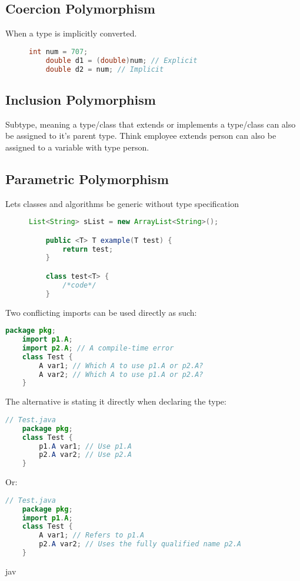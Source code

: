 \subsection*{Coercion Polymorphism}
When a type is implicitly converted.
\begin{figure}[h!]
    \begin{lstlisting}[language=Java]
    int num = 707;
    double d1 = (double)num; // Explicit
    double d2 = num; // Implicit
    \end{lstlisting}
\end{figure}

\subsection*{Inclusion Polymorphism}\label{sec:inclusion_polymorphism}
Subtype, meaning a type/class that extends or implements a type/class can also be assigned to it's parent type. Think employee extends person can also be assigned to a variable with type person.
\clearpage
\subsection*{Parametric Polymorphism}\label{sec:parametric_polymorphism}
Lets classes and algorithms be generic without type specification
\begin{figure}[h!]
    \begin{lstlisting}[language=Java]
    List<String> sList = new ArrayList<String>();

    public <T> T example(T test) {
        return test;
    }

    class test<T> {
        /*code*/
    }
    \end{lstlisting}
\end{figure}
Two conflicting imports can be used directly as such:
\begin{lstlisting}[language=Java]
    package pkg;
    import p1.A;
    import p2.A; // A compile-time error
    class Test {
        A var1; // Which A to use p1.A or p2.A?
        A var2; // Which A to use p1.A or p2.A?
    }
\end{lstlisting}
The alternative is stating it directly when declaring the type:
\begin{lstlisting}[language=Java]
    // Test.java
    package pkg;
    class Test {
        p1.A var1; // Use p1.A
        p2.A var2; // Use p2.A
    }
\end{lstlisting}
Or:
\begin{lstlisting}[language=Java]
    // Test.java
    package pkg;
    import p1.A;
    class Test {
        A var1; // Refers to p1.A
        p2.A var2; // Uses the fully qualified name p2.A
    }
\end{lstlisting}
jav